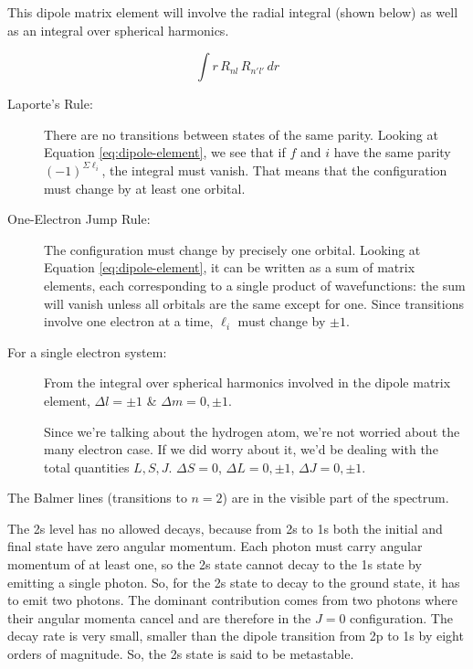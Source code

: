 \documentclass[12pt, letterpaper, preprint]{aastex}
\begin{document}
\begin{enumerate}
This dipole matrix element will involve the radial integral (shown below) as well as an integral over spherical harmonics.

\begin{equation}
\int r \, R_{nl} \, R_{n' l'} \, dr
\end{equation}

\begin{description}

\item[Laporte's Rule:]
There are no transitions between states of the same parity.
Looking at Equation \ref{eq:dipole-element}, we see that if
$f$ and $i$ have the same parity $(-1)^{\Sigma \ell_i}$,
the integral must vanish. 
That means that the configuration must change by at least one orbital.

\item[One-Electron Jump Rule:] The configuration must change by precisely one orbital.
Looking at Equation \ref{eq:dipole-element}, it can be written as a sum of matrix elements, each corresponding to a single product of wavefunctions: the sum will vanish unless all orbitals are the same except for one. 
Since transitions involve one electron at a time,
$\ell_i$ must change by $\pm 1$.

\item[For a single electron system:] From the integral over spherical harmonics involved in the dipole matrix element,
$\Delta l = \pm 1$ \& $\Delta m = 0, \pm 1$.

Since we're talking about the hydrogen atom, we're not worried about the many electron case. If we did worry about it, we'd be dealing with the total quantities $L, S, J$.
$\Delta S = 0$, $\Delta L = 0, \pm1$, $\Delta J = 0, \pm 1$. 

\end{description}

The Balmer lines (transitions to $n=2$)
are in the visible part of the spectrum. 

The 2s level has no allowed decays, because from 2s to 1s both the initial and final state have zero angular momentum. Each photon must carry angular momentum of at least one, so the 2s state cannot decay to the 1s state by emitting a single photon. So, for the 2s state to decay to the ground state, it has to emit two photons. The dominant contribution comes from two photons where their angular momenta cancel and are therefore in the $ J = 0 $ configuration. The decay rate is very small, smaller than the dipole transition from 2p to 1s by eight orders of magnitude. So, the 2s state is said to be metastable.
    
\end{enumerate} \newpage
\end{document}
